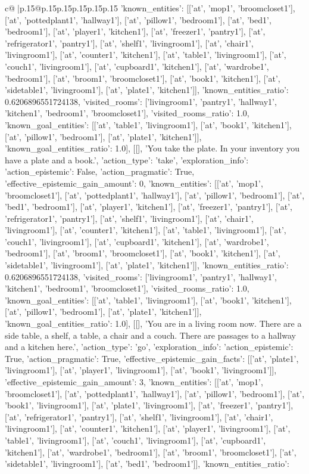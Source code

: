 \documentclass{article}
\begin{document}
{\begin{supertabular}{c@{$\;$}|p{.15\linewidth}@{}p{.15\linewidth}p{.15\linewidth}p{.15\linewidth}p{.15\linewidth}p{.15\linewidth}}
{{{'known_entities': [['at', 'mop1', 'broomcloset1'], ['at', 'pottedplant1', 'hallway1'], ['at', 'pillow1', 'bedroom1'], ['at', 'bed1', 'bedroom1'], ['at', 'player1', 'kitchen1'], ['at', 'freezer1', 'pantry1'], ['at', 'refrigerator1', 'pantry1'], ['at', 'shelf1', 'livingroom1'], ['at', 'chair1', 'livingroom1'], ['at', 'counter1', 'kitchen1'], ['at', 'table1', 'livingroom1'], ['at', 'couch1', 'livingroom1'], ['at', 'cupboard1', 'kitchen1'], ['at', 'wardrobe1', 'bedroom1'], ['at', 'broom1', 'broomcloset1'], ['at', 'book1', 'kitchen1'], ['at', 'sidetable1', 'livingroom1'], ['at', 'plate1', 'kitchen1']], 'known_entities_ratio': 0.6206896551724138, 'visited_rooms': ['livingroom1', 'pantry1', 'hallway1', 'kitchen1', 'bedroom1', 'broomcloset1'], 'visited_rooms_ratio': 1.0, 'known_goal_entities': [['at', 'table1', 'livingroom1'], ['at', 'book1', 'kitchen1'], ['at', 'pillow1', 'bedroom1'], ['at', 'plate1', 'kitchen1']], 'known_goal_entities_ratio': 1.0}}], [[], 'You take the plate. In your inventory you have a plate and a book.', {'action_type': 'take', 'exploration_info': {'action_epistemic': False, 'action_pragmatic': True, 'effective_epistemic_gain_amount': 0, 'known_entities': [['at', 'mop1', 'broomcloset1'], ['at', 'pottedplant1', 'hallway1'], ['at', 'pillow1', 'bedroom1'], ['at', 'bed1', 'bedroom1'], ['at', 'player1', 'kitchen1'], ['at', 'freezer1', 'pantry1'], ['at', 'refrigerator1', 'pantry1'], ['at', 'shelf1', 'livingroom1'], ['at', 'chair1', 'livingroom1'], ['at', 'counter1', 'kitchen1'], ['at', 'table1', 'livingroom1'], ['at', 'couch1', 'livingroom1'], ['at', 'cupboard1', 'kitchen1'], ['at', 'wardrobe1', 'bedroom1'], ['at', 'broom1', 'broomcloset1'], ['at', 'book1', 'kitchen1'], ['at', 'sidetable1', 'livingroom1'], ['at', 'plate1', 'kitchen1']], 'known_entities_ratio': 0.6206896551724138, 'visited_rooms': ['livingroom1', 'pantry1', 'hallway1', 'kitchen1', 'bedroom1', 'broomcloset1'], 'visited_rooms_ratio': 1.0, 'known_goal_entities': [['at', 'table1', 'livingroom1'], ['at', 'book1', 'kitchen1'], ['at', 'pillow1', 'bedroom1'], ['at', 'plate1', 'kitchen1']], 'known_goal_entities_ratio': 1.0}}], [[], 'You are in a living room now. There are a side table, a shelf, a table, a chair and a couch. There are passages to a hallway and a kitchen here.', {'action_type': 'go', 'exploration_info': {'action_epistemic': True, 'action_pragmatic': True, 'effective_epistemic_gain_facts': [['at', 'plate1', 'livingroom1'], ['at', 'player1', 'livingroom1'], ['at', 'book1', 'livingroom1']], 'effective_epistemic_gain_amount': 3, 'known_entities': [['at', 'mop1', 'broomcloset1'], ['at', 'pottedplant1', 'hallway1'], ['at', 'pillow1', 'bedroom1'], ['at', 'book1', 'livingroom1'], ['at', 'plate1', 'livingroom1'], ['at', 'freezer1', 'pantry1'], ['at', 'refrigerator1', 'pantry1'], ['at', 'shelf1', 'livingroom1'], ['at', 'chair1', 'livingroom1'], ['at', 'counter1', 'kitchen1'], ['at', 'player1', 'livingroom1'], ['at', 'table1', 'livingroom1'], ['at', 'couch1', 'livingroom1'], ['at', 'cupboard1', 'kitchen1'], ['at', 'wardrobe1', 'bedroom1'], ['at', 'broom1', 'broomcloset1'], ['at', 'sidetable1', 'livingroom1'], ['at', 'bed1', 'bedroom1']], 'known_entities_ratio': }}}
\end{supertabular}}
\end{document}
